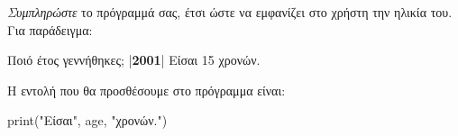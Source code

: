 \documentclass[a4paper,11pt,oneside]{book}
\begin{document}
\begin{step}
\emph{Συμπληρώστε} το πρόγραμμά σας, έτσι ώστε να εμφανίζει στο χρήστη την ηλικία του. Για παράδειγμα:

\marginnote[24pt]{\iconcomputer\hspace{1ex}\iconkeyboard}
\begin{pyterm}
Ποιό έτος γεννήθηκες;
|\textbf{2001}|
Είσαι 15 χρονών.
\end{pyterm}

\begin{answer}
Η εντολή που θα προσθέσουμε στο πρόγραμμα είναι:

\begin{pynew}
print("Είσαι", age, "χρονών.")
\end{pynew}
\end{answer}
\end{step}
\end{document}
